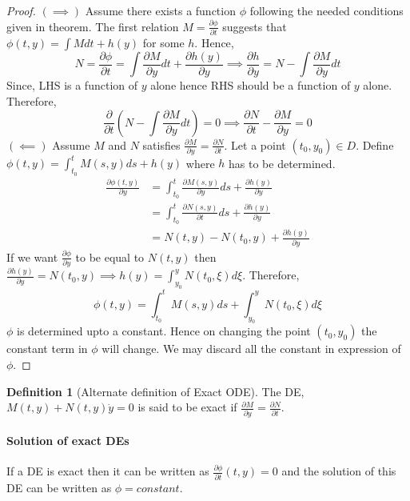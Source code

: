 \documentclass[12pt,reqno]{amsart}
\theoremstyle{plain}
\theoremstyle{definition}
\newtheorem{defn}{Definition}
\newcommand{\pd}{\partial}
\begin{document}
\begin{proof}
    $(\implies)$ Assume there exists a function $\phi$ following the needed conditions given in theorem. The first relation $M = \frac{\partial \phi}{\partial t}$ suggests that $\phi(t, y) = \int M dt + h(y) $ for some $h$. Hence,
    $$ N = \frac{\partial \phi}{\partial t} = \int \frac{\partial M}{\partial y} dt + \frac{\partial h(y)}{\partial y} \implies \frac{\partial h}{\partial y} = N - \int \frac{\partial M}{\partial y} dt $$
    Since, LHS is a function of $y$ alone hence RHS should be a function of $y$ alone. Therefore,
    $$ \frac{\partial}{\partial t}\left(N - \int \frac{\partial M}{\partial y} dt\right) = 0 \implies \frac{\partial N}{\partial t} - \frac{\partial M}{\partial y} = 0$$
    $(\impliedby)$ Assume $M$ and $N$ satisfies $\frac{\pd M}{\pd y} = \frac{\pd N}{\pd t}$. Let a point $(t_0, y_0) \in D$. Define $\phi(t,y) = \int_{t_0}^{t} M(s,y) ds + h(y)$ where $h$ has to be determined. 
    \begin{align*}
        \frac{\pd \phi(t,y)}{\pd y} &= \int_{t_0}^{t} \frac{\pd M(s,y)}{\pd y} ds + \frac{\pd h(y)}{\pd y} \\
        &= \int_{t_0}^{t} \frac{\pd N(s, y)}{\pd t} ds + \frac{\pd h(y)}{\pd y}\\
        &= N(t, y) - N(t_0, y) + \frac{\pd h(y)}{\pd y}
    \end{align*}
    If we want $\frac{\pd \phi}{\pd y}$ to be equal to $N(t,y)$ then $\frac{\pd h(y)}{\pd y} = N(t_0,y) \implies h(y) = \int_{y_0}^{y} N(t_0, \xi) d\xi$. Therefore, 
    $$ \phi (t, y) = \int_{t_0}^{t} M(s, y) ds + \int_{y_0}^{y} N(t_0, \xi) d\xi$$ 
    $\phi$ is determined upto a constant. Hence on changing the point $(t_0, y_0)$ the constant term in $\phi$ will change. We may discard all the constant in expression of $\phi$.
\end{proof}
\begin{defn}[Alternate definition of Exact ODE]
    The DE, $M(t,y) + N(t, y)\dot{y} = 0$ is said to be exact if $\frac{\pd M}{\pd y} = \frac{\pd N}{\pd t}$.     
\end{defn}
\paragraph{\bf Solution of exact DEs} If a DE is exact then it can be written as $\frac{\pd \phi}{\pd t}(t,y) = 0$ and the solution of this DE can be written as $\phi = constant$.
\end{document}

